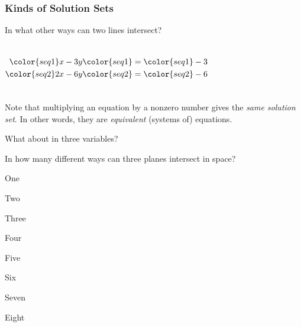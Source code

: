 \begin{frame}
\frametitle{Kinds of Solution Sets}
  
In what other ways can two lines intersect?

\pause\vfill

\begin{columns}[onlytextwidth]
  \[\begin{split}
    \color{seq1}x - 3y &\color{seq1}= \color{seq1}-3 \\
    \color{seq2}2x - 6y &\color{seq2}= \color{seq2}-6
  \end{split}\]
  \pause
  \centering
\end{columns}

\pause
\bigskip
Note that multiplying an equation by a nonzero number gives the
\emph{same solution set}.
\pause In other words, they are \emph{equivalent} (systems
of) equations.

\vfill

\end{frame}



\begin{pollframe}

What about in three variables?
\pause
\bigskip

\begin{poll}
\begin{bluebox}[Poll]{.65\textwidth}
  In how many different ways can three planes intersect in space?

  \smallskip
  \begin{eAlpherate}
  \item One
  \item Two
  \item Three
  \item Four
  \item Five
  \item Six
  \item Seven
  \item Eight
  \end{eAlpherate}
\end{bluebox}
\end{poll}


\end{pollframe}


